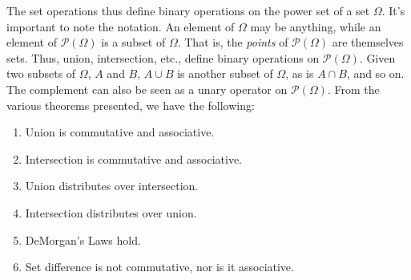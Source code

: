         The set operations thus define binary operations
        on the power set of a set $\Omega$. It's important
        to note the notation. An element of $\Omega$ may
        be anything, while an element of
        $\mathcal{P}(\Omega)$ is a subset of $\Omega$.
        That is, the \textit{points} of $\mathcal{P}(\Omega)$
        are themselves sets. Thus, union, intersection,
        etc., define binary operations on
        $\mathcal{P}(\Omega)$. Given two subsets of
        $\Omega$, $A$ and $B$, $A\cup{B}$ is another
        subset of $\Omega$, as is $A\cap{B}$, and so on.
        The complement can also be seen as a unary operator
        on $\mathcal{P}(\Omega)$. From the various theorems
        presented, we have the following:
        \begin{enumerate}
            \item Union is commutative and associative.
            \item Intersection is commutative and
                  associative.
            \item Union distributes over intersection.
            \item Intersection distributes over union.
            \item DeMorgan's Laws hold.
            \item Set difference is not commutative,
                  nor is it associative.
        \end{enumerate}
